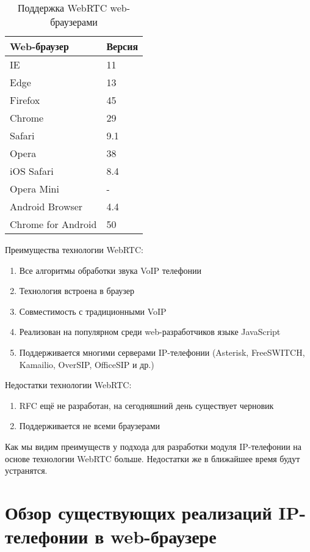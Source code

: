 \begin{table}
    \caption{Поддержка WebRTC web-браузерами}
    \begin{center}
    \begin{tabular}{|l|l|}
    \hline
    \textbf{Web-браузер} & \textbf{Версия}\\
    \hline
    IE & 11 \\
    \hline
    Edge & 13 \\
    \hline
    Firefox & 45 \\
    \hline
    Chrome & 29 \\
    \hline
    Safari & 9.1 \\
    \hline
    Opera & 38 \\
    \hline
    iOS Safari & 8.4 \\
    \hline
    Opera Mini & - \\
    \hline
    Android Browser & 4.4 \\
    \hline
    Chrome for Android & 50 \\
    \hline
    \end{tabular}
    \end{center}
    \label{table:browsers}
\end{table}

Преимущества технологии WebRTC:
\begin{enumerate}
\item Все алгоритмы обработки звука VoIP телефонии
\item Технология встроена в браузер
\item Совместимость с традиционными VoIP
\item Реализован на популярном среди web-разработчиков языке JavaScript
\item Поддерживается многими серверами IP-телефонии (Asterisk, FreeSWITCH, Kamailio, OverSIP, OfficeSIP и др.)
\end{enumerate}

Недостатки технологии WebRTC:
\begin{enumerate}
\item RFC ещё не разработан, на сегодняшний день существует черновик\cite{WebRTC_W3C}
\item Поддерживается не всеми браузерами
\end{enumerate}

Как мы видим преимуществ у подхода для разработки модуля IP-телефонии на основе технологии WebRTC больше. Недостатки же в ближайшее время будут устранятся.

\section{Обзор существующих реализаций IP-телефонии в web-браузере}
\label{section:review}

